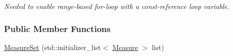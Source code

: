 \begin{DoxyCompactItemize}
\begin{DoxyCompactList}\small\item\em Needed to enable range-\/based for-\/loop with a const-\/reference loop variable. \end{DoxyCompactList}\end{DoxyCompactItemize}
\subsubsection*{Public Member Functions}
\begin{DoxyCompactItemize}
\item 
\hyperlink{structMeasureSet_a3d447146891ebc838e8bef05cf91eabe}{Measure\+Set} (std\+::initializer\+\_\+list$<$ \hyperlink{structMeasure}{Measure} $>$ list)\hypertarget{structMeasureSet_a3d447146891ebc838e8bef05cf91eabe}{}\label{structMeasureSet_a3d447146891ebc838e8bef05cf91eabe}


\end{DoxyCompactItemize}
